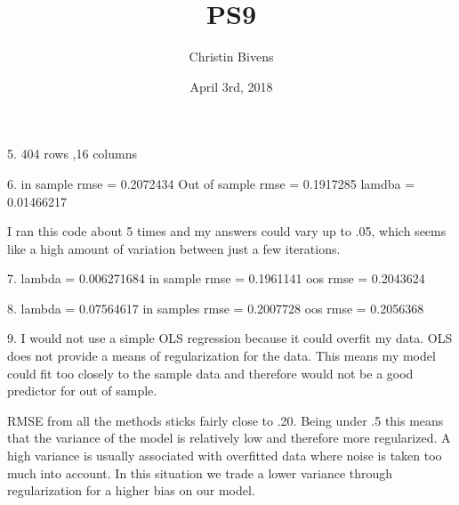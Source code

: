 \documentclass{article}
\title{PS9}
\author{Christin Bivens}
\date{April 3rd, 2018}
\begin{document}
\maketitle

5. 404 rows ,16 columns

6. in sample rmse = 0.2072434
   Out of sample rmse = 0.1917285
   lamdba = 0.01466217
  
  I ran this code about 5 times and my answers could vary up to .05, which seems like a high amount of variation between just a few iterations. 
  
7. lambda = 0.006271684
   in sample rmse = 0.1961141
   oos rmse = 0.2043624
   
8. lambda = 0.07564617
   in samples rmse = 0.2007728
   oos rmse = 0.2056368
   
9.  I would not use a simple OLS regression because it could overfit my data. OLS does not provide a means of regularization for the data. This means my model could fit too closely to the sample data and therefore would not be a good predictor for out of sample.

RMSE from all the methods sticks fairly close to .20. Being under .5 this means that the variance of the model is relatively low and therefore more regularized. A high variance is usually associated with overfitted data where noise is taken too much into account. In this situation we trade a lower variance through regularization for a higher bias on our model. 
   

   
\end{document}

